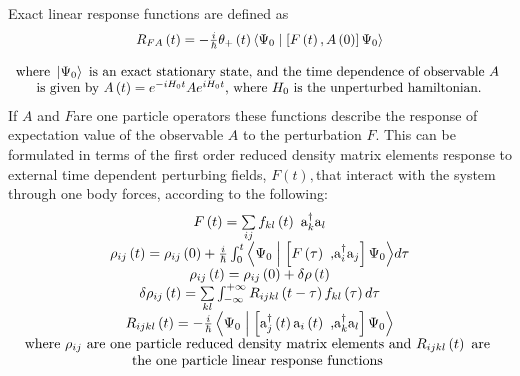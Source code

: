 \documentclass{amsart}
\begin{document}
Exact linear response functions are defined as
\[
\begin{array}{c}
 R_{FA} \left( t \right)=-\frac{i}{\hbar }\theta _+ \left( t
\right)\left\langle {\Psi _0 } \mathrel{\left| {\vphantom {{\Psi _0 }
{\left[ {F\left( t \right),A\left( 0 \right)} \right]\Psi _0 }}} \right.
\kern-\nulldelimiterspace} {\left[ {F\left( t \right),A\left( 0 \right)}
\right]\Psi _0 } \right\rangle \\
 \mbox{ } \\
 \mbox{where }\left| {\Psi _0 } \right\rangle \mbox{ is an exact stationary
state, and the time dependence of observable }A\mbox{ } \\
 \mbox{ is given by }A\left( t \right)=e^{-iH_0 t}Ae^{iH_0 t}\mbox{, where
}H_0 \mbox{ is the unperturbed hamiltonian. } \\
 \end{array}
\]
If $A$ and $F $are one particle operators these functions describe the response of
expectation value of the observable $A$ to the perturbation $F$. This can be
formulated in terms of the first order reduced density matrix elements
response to external time dependent perturbing fields, $F(t) , $that interact with
the system through one body forces, according to the following:
\[
\begin{array}{c}
 F\left( t \right)=\sum\limits_{ij} {f_{kl} \left( t \right)\mbox{ }}
\mbox{a}_k^\dag \mbox{a}_l \\
 \rho _{ij} \left( t \right)=\rho _{ij} \left( 0 \right)+\frac{i}{\hbar
}\int_0^t {\left\langle {\Psi _0 } \mathrel{\left| {\vphantom {{\Psi _0 }
{\left[ {F\left( \tau \right)\mbox{ ,a}_i^\dag \mbox{a}_j } \right]\Psi _0
}}} \right. \kern-\nulldelimiterspace} {\left[ {F\left( \tau \right)\mbox{
,a}_i^\dag \mbox{a}_j } \right]\Psi _0 } \right\rangle } d\tau \\
 \rho _{ij} \left( t \right)=\rho _{ij} \left( 0 \right)+\delta \rho \left(
t \right) \\
 \delta \rho _{ij} \left( t \right)=\sum\limits_{kl} {\int_{-\infty
}^{+\infty } {R_{ijkl} \left( {t-\tau } \right)f_{kl} \left( \tau
\right)d\tau } } \\
 R_{ijkl} \left( t \right)=-\frac{i}{\hbar }\left\langle {\Psi _0 }
\mathrel{\left| {\vphantom {{\Psi _0 } {\left[ {\mbox{a}_j^\dag \left( t
\right)\mbox{a}_i \left( t \right)\mbox{ ,a}_k^\dag \mbox{a}_l } \right]\Psi
_0 }}} \right. \kern-\nulldelimiterspace} {\left[ {\mbox{a}_j^\dag \left( t
\right)\mbox{a}_i \left( t \right)\mbox{ ,a}_k^\dag \mbox{a}_l } \right]\Psi
_0 } \right\rangle \\
 \mbox{where }\rho _{ij} \mbox{ are one particle reduced density matrix
elements and }R_{ijkl} \left( t \right)\mbox{ are } \\
 \mbox{the one particle linear response functions } \\
 \end{array}
\]
\end{document}
